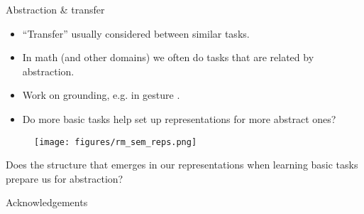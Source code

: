 \documentclass{beamer}
\begin{document}
\begin{frame}{Abstraction \& transfer}
\begin{itemize}
\item ``Transfer'' usually considered between similar tasks.
\item <2->In math (and other domains) we often do tasks that are related by abstraction. 
\item <3->Work on grounding, e.g. in gesture \cite{Wakefield2018}.
\item <4->Do more basic tasks help set up representations for more abstract ones?
\end{itemize}
\begin{figure}
\centering
{}
 {
\texttt{[image: figures/rm\_sem\_reps.png]}
}
\end{figure}
\end{frame}

\begin{frame}[standout]
Does the structure that emerges in our representations when learning basic tasks prepare us for abstraction?
\end{frame}


\begin{frame}[fragile]{Acknowledgements}
\vspace{1em}
\begin{figure}
\centering
{}
\end{figure}
\end{frame}

\begin{frame}[allowframebreaks]

{}
\end{frame}
\end{document}
